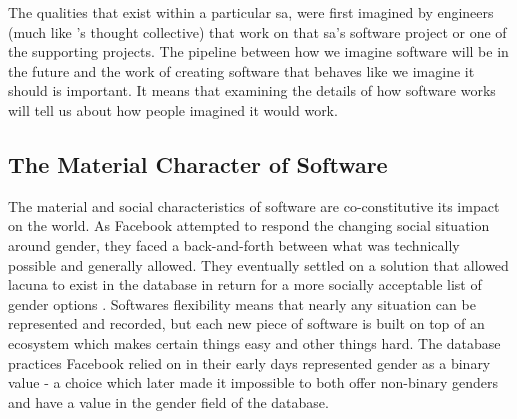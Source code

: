 \documentclass[a4paper,man,natbib,floatsintext]{apa6}
\begin{document}
  The qualities that exist within a particular \gls{sa}, were first imagined by engineers (much like \citet{Fleck2012-qr}'s thought collective) that work on that \gls{sa}'s software project or one of the supporting projects. The pipeline between how we imagine software will be in the future and the work of creating software that behaves like we imagine it should is important. It means that examining the details of how software works will tell us about how people imagined it would work.


  
  \subsection*{The Material Character of Software}
  The material and social characteristics of software are co-constitutive its impact on the world. As Facebook attempted to respond the changing social situation around gender, they faced a back-and-forth between what was technically possible and generally allowed. They eventually settled on a solution that allowed lacuna to exist in the database in return for a more socially acceptable list of gender options \citep{Bivens2017-tc}. Softwares flexibility means that nearly any situation can be represented and recorded, but each new piece of software is built on top of an ecosystem which makes certain things easy and other things hard. The database practices Facebook relied on in their early days represented gender as a binary value - a choice which later made it impossible to both offer non-binary genders and have a value in the gender field of the database.
\end{document}

